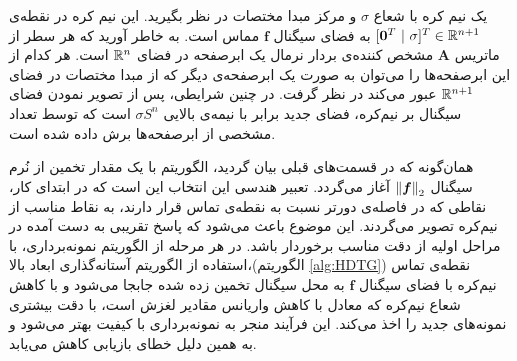 یک نیم کره با شعاع 
$\sigma$
و مرکز مبدا مختصات در نظر بگیرید. این نیم کره در نقطه‌ی 
$ [\bm{0}^{T}~|~\sigma]^{T}\in \mathbb{R}^{n+1} $
به فضای سیگنال
$ \bm{f} $ 
مماس است. به خاطر آورید که هر سطر از ماتریس 
$\bm{A}$
مشخص کننده‌ی بردار نرمال یک ابرصفحه در فضای
$ \mathbb{R}^{n} $
است. هر کدام از این ابرصفحه‌ها را می‌توان به صورت یک ابرصفحه‌ی دیگر که از مبدا مختصات در فضای 
$ \mathbb{R}^{n+1} $
عبور می‌کند در نظر گرفت. در چنین شرایطی، پس از تصویر نمودن فضای سیگنال بر نیم‌کره، فضای جدید برابر با نیمه‌ی بالایی 
 $ \sigma S^{n} $
است که توسط تعداد مشخصی از ابرصفحه‌ها برش داده شده است.

همان‌گونه که در قسمت‌های قبلی بیان گردید،  الگوریتم با یک مقدار تخمین از نُرم سیگنال
$ \left\lVert\bm{f}\right\rVert_{2} $
آغاز می‌گردد. تعبیر هندسی این انتخاب این است که در ابتدای کار، نقاطی که در فاصله‌ی دورتر نسبت به نقطه‌ی تماس قرار دارند، به نقاط مناسب از نیم‌کره تصویر می‌گردند. این موضوع باعث می‌شود که پاسخ تقریبی به دست آمده در مراحل اولیه از دقت مناسب برخوردار باشد. در هر مرحله از الگوریتم نمونه‌برداری، با استفاده از الگوریتم آستانه‌گذاری ابعاد بالا،(الگوریتم
\ref{alg:HDTG})
نقطه‌ی تماس نیم‌کره با فضای سیگنال
$ \bm{f} $ 
به محل سیگنال تخمین زده شده جابجا می‌شود و با کاهش شعاع نیم‌کره که معادل با کاهش واریانس مقادیر لغزش است، با دقت بیشتری نمونه‌های جدید را اخذ می‌کند. این فرآیند منجر به نمونه‌برداری با کیفیت بهتر می‌شود و به همین دلیل خطای بازیابی کاهش می‌یابد.














